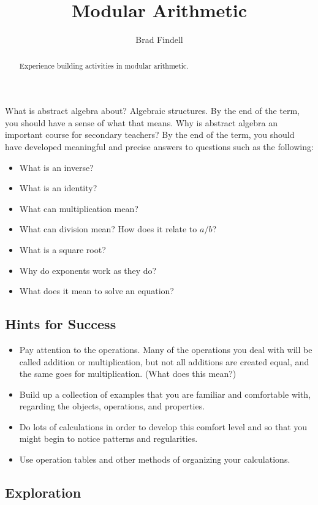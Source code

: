 \documentclass[space,nooutcomes,handout]{ximera}
\title{Modular Arithmetic}
\author{Brad Findell}
\begin{document}
\begin{abstract}
Experience building activities in modular arithmetic.  
\end{abstract}
\maketitle

What is abstract algebra about?  Algebraic structures.  By the end of the term, you should have a sense of what that means.  Why is abstract algebra an important course for secondary teachers?  By the end of the term, you should have developed meaningful and precise answers to questions such as the following: 

\begin{itemize}
\item What is an inverse? 
\item What is an identity?
\item What can multiplication mean?  
\item What can division mean?  How does it relate to $a/b$?  
\item What is a square root?
\item Why do exponents work as they do?
\item What does it mean to solve an equation?
\end{itemize}

\subsection*{Hints for Success}
\begin{itemize}
\item Pay attention to the operations.  Many of the operations you deal with will be called addition or multiplication, but not all additions are created equal, and the same goes for multiplication.  (What does this mean?)
\item Build up a collection of examples that you are familiar and comfortable with, regarding the objects, operations, and properties.  
\item Do lots of calculations in order to develop this comfort level and so that you might begin to notice patterns and regularities. 
\item Use operation tables and other methods of organizing your calculations.
\end{itemize}


\subsection*{Exploration}
\end{document}
